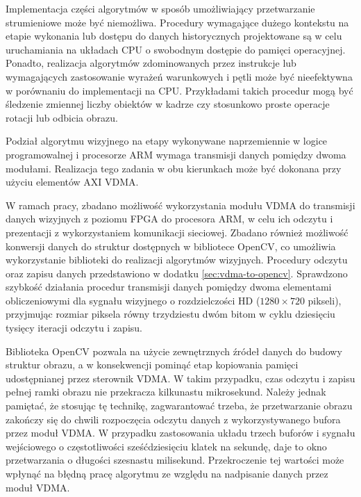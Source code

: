 Implementacja części algorytmów w sposób umożliwiający przetwarzanie strumieniowe może być niemożliwa. %
Procedury wymagające dużego kontekstu na etapie wykonania lub dostępu do danych historycznych projektowane są w celu uruchamiania na układach CPU o swobodnym dostępie do pamięci operacyjnej. Ponadto, realizacja algorytmów zdominowanych przez instrukcje lub wymagających zastosowanie wyrażeń warunkowych i pętli może być nieefektywna w porównaniu do implementacji na CPU. Przykładami takich procedur mogą być śledzenie zmiennej liczby obiektów w kadrze czy stosunkowo proste operacje rotacji lub odbicia obrazu.%

Podział algorytmu wizyjnego na etapy wykonywane naprzemiennie w logice programowalnej i procesorze ARM wymaga transmisji danych pomiędzy dwoma modułami. %
Realizacja tego zadania w obu kierunkach może być dokonana przy użyciu elementów AXI VDMA.

W ramach pracy, zbadano możliwość wykorzystania modułu VDMA do transmisji danych wizyjnych z poziomu FPGA do procesora ARM, w celu ich odczytu i prezentacji z wykorzystaniem komunikacji sieciowej.
Zbadano również możliwość konwersji danych do struktur dostępnych w bibliotece OpenCV, co umożliwia wykorzystanie biblioteki do realizacji algorytmów wizyjnych. 
Procedury odczytu oraz zapisu danych przedstawiono w dodatku \ref{sec:vdma-to-opencv}.
Sprawdzono szybkość działania procedur transmisji danych pomiędzy dwoma elementami obliczeniowymi dla sygnału wizyjnego o rozdzielczości HD ($1280 \times 720$ pikseli), przyjmując rozmiar piksela równy trzydziestu dwóm bitom w cyklu dziesięciu tysięcy iteracji odczytu i zapisu.

Biblioteka OpenCV pozwala na użycie zewnętrznych źródeł danych do budowy struktur obrazu, a w konsekwencji pominąć etap kopiowania pamięci udostępnianej przez sterownik VDMA. %
W takim przypadku, czas odczytu i zapisu pełnej ramki obrazu nie przekracza kilkunastu mikrosekund. 
Należy jednak pamiętać, że stosując tę technikę, zagwarantować trzeba, że przetwarzanie obrazu zakończy się do chwili rozpoczęcia odczytu danych z wykorzystywanego bufora przez moduł VDMA. 
W przypadku zastosowania układu trzech buforów i sygnału wejściowego o częstotliwości sześćdziesięciu klatek na sekundę, daje to okno przetwarzania o długości szesnastu milisekund. 
Przekroczenie tej wartości może wpłynąć na błędną pracę algorytmu ze względu na nadpisanie danych przez moduł VDMA.


